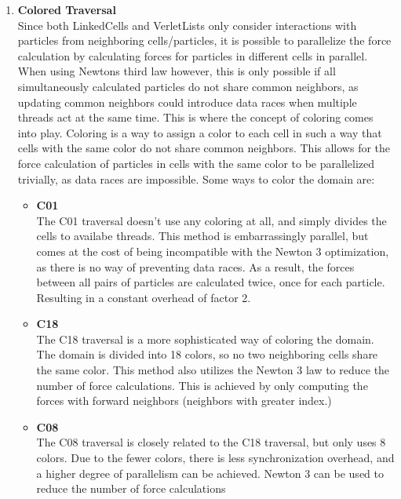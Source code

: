 \begin{enumerate}[label=\textbf{\arabic*.}]
\begin{enumerate}
                  \item \textbf{Colored Traversal} \\
                        Since both LinkedCells and VerletLists only consider interactions with particles from neighboring cells/particles, it is possible to parallelize the force calculation by calculating forces for particles in different cells in parallel. When using Newtons third law however, this is only possible if all simultaneously calculated particles do not share common neighbors, as updating common neighbors could introduce data races when multiple threads act at the same time. This is where the concept of coloring comes into play. Coloring is a way to assign a color to each cell in such a way that cells with the same color do not share common neighbors. This allows for the force calculation of particles in cells with the same color to be parallelized trivially, as data races are impossible. Some ways to color the domain are:
                        \begin{itemize}
                              \item \textbf{C01} \\
                                    The C01 traversal doesn't use any coloring at all, and simply divides the cells to availabe threads. This method is embarrassingly parallel, but comes at the cost of being incompatible with the Newton 3 optimization, as there is no way of preventing data races. As a result, the forces between all pairs of particles are calculated twice, once for each particle. Resulting in a constant overhead of factor 2.

                              \item \textbf{C18} \\
                                    The C18 traversal is a more sophisticated way of coloring the domain. The domain is divided into 18 colors, so no two neighboring cells share the same color. This method also utilizes the Newton 3 law to reduce the number of force calculations. This is achieved by only computing the forces with forward neighbors (neighbors with greater index.) ~\cite{GRATL2022108262}

                              \item \textbf{C08} \\
                                    The C08 traversal is closely related to the C18 traversal, but only uses 8 colors. Due to the fewer colors, there is less synchronization overhead, and a higher degree of parallelism can be achieved. Newton 3 can be used to reduce the number of force calculations
                        \end{itemize}


\end{enumerate}
\end{enumerate}
